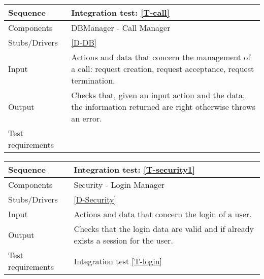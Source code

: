 \begin{table}[H]
    \begin{tabularx}{\textwidth}{l|X}
        \hline
        Sequence
        & 
        Integration test: \ref{T-call}
        \\ \hline
        Components 
        & 
        DBManager - Call Manager
        \\ \hline
        Stubs/Drivers 
        & 
        \ref{D-DB}
        \\ \hline
        Input 
        & 
        Actions and data that concern the management of a call: request creation, request acceptance, request termination.
        \\ \hline
        Output 
        & 
        Checks that, given an input action and the data, the information returned are right otherwise throws an error.
        \\ \hline
        Test requirements 
        & 
        
        \\ \hline
    \end{tabularx}
\end{table}

\begin{table}[H]
    \begin{tabularx}{\textwidth}{l|X}
        \hline
        Sequence
        & 
        Integration test: \ref{T-security1}
        \\ \hline
        Components 
        & 
        Security - Login Manager
        \\ \hline
        Stubs/Drivers 
        & 
        \ref{D-Security}
        \\ \hline
        Input 
        & 
        Actions and data that concern the login of a user.
        \\ \hline
        Output 
        & 
        Checks that the login data are valid and if already exists a session for the user.
        \\ \hline
        Test requirements 
        & 
        Integration test \ref{T-login}
        \\ \hline
    \end{tabularx}
\end{table}

